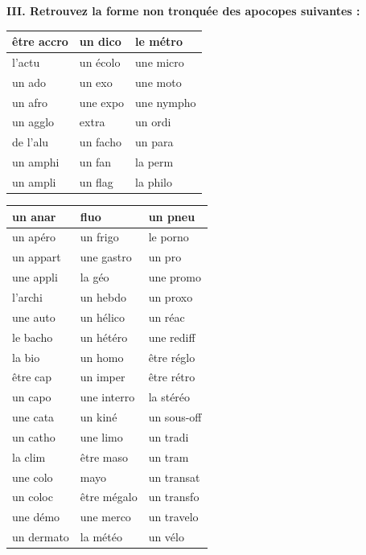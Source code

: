 \textbf{III. Retrouvez la forme non tronquée des apocopes suivantes :}
\begin{center}
\begin{tabularx}{.95\linewidth}{|>{\centering\arraybackslash}X|>{\centering\arraybackslash}X|>{\centering\arraybackslash}X|}
\hline
être accro&un dico&le métro\\\hline
l’actu&un écolo&une micro\\\hline
un ado&un exo&une moto\\\hline
un afro&une expo&une nympho\\\hline
un agglo&extra&un ordi\\\hline
de l’alu&un facho&un para\\\hline
un amphi&un fan&la perm\\\hline
un ampli&un flag&la philo\\\hline
\end{tabularx}
\end{center}

\begin{center}
\begin{tabularx}{.95\linewidth}{|>{\centering\arraybackslash}X|>{\centering\arraybackslash}X|>{\centering\arraybackslash}X|}
\hline
un anar&fluo&un pneu\\\hline
un apéro&un frigo&le porno\\\hline
un appart&une gastro&un pro\\\hline
une appli&la géo&une promo\\\hline
l’archi&un hebdo&un proxo\\\hline
une auto&un hélico&un réac\\\hline
le bacho&un hétéro&une rediff\\\hline
la bio&un homo&être réglo\\\hline
être cap&un imper&être rétro\\\hline
un capo&une interro&la stéréo\\\hline
une cata&un kiné&un sous-off\\\hline
un catho&une limo&un tradi\\\hline
la clim&être maso&un tram\\\hline
une colo&mayo&un transat\\\hline
un coloc&être mégalo&un transfo\\\hline
une démo&une merco&un travelo\\\hline
un dermato&la météo&un vélo\\\hline
\end{tabularx}
\end{center}

